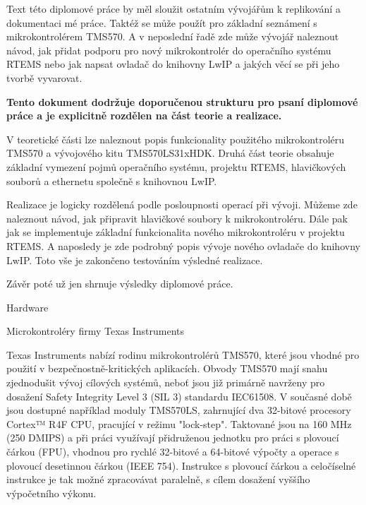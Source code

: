 
Text této diplomové práce by měl sloužit ostatním vývojářům k replikování a dokumentaci mé práce.
Taktéž se může použít pro základní seznámení s mikrokontrolérem TMS570.
A v neposlední řadě zde může vývojář naleznout návod, jak přidat podporu pro nový mikrokontrolér do operačního systému RTEMS nebo jak napsat ovladač do knihovny LwIP a jakých věcí se při jeho tvorbě vyvarovat.   

\medskip

{\bf
Tento dokument dodržuje doporučenou strukturu pro psaní diplomové práce a je explicitně rozdělen na část teorie a realizace.

V teoretické části lze naleznout popis funkcionality použitého mikrokontroléru TMS570 a vývojového kitu TMS570LS31xHDK.
Druhá část teorie obsahuje základní vymezení pojmů operačního systému, projektu RTEMS, hlavičkových souborů a ethernetu společně s knihovnou LwIP.

Realizace je logicky rozdělená podle posloupnosti operací při vývoji.
Můžeme zde naleznout návod, jak připravit hlavičkové soubory k mikrokontroléru.
Dále pak jak se implementuje základní funkcionalita nového mikrokontroléru v projektu RTEMS.
A naposledy je zde podrobný popis vývoje nového ovladače do knihovny LwIP.
Toto vše je zakončeno testováním výsledné realizace.

Závěr poté už jen shrnuje výsledky diplomové práce.}

\chap Hardware

\sec Microkontroléry firmy Texas Instruments

Texas Instruments nabízí rodinu mikrokontrolérů TMS570, které jsou vhodné pro použití v bezpečnostně-kritických aplikacích.
Obvody TMS570 mají snahu zjednodušit vývoj cílových systémů, neboť jsou již primárně navrženy pro dosažení Safety Integrity Level 3 (SIL 3) standardu IEC61508.
V současné době jsou dostupné například moduly TMS570LS, zahrnující dva 32-bitové procesory Cortex™ R4F CPU, pracující v režimu "lock-step".
Taktované jsou na 160 MHz (250 DMIPS) a při práci využívají přidruženou jednotku pro práci s plovoucí čárkou (FPU), vhodnou pro rychlé 32-bitové a 64-bitové výpočty a operace s plovoucí desetinnou čárkou (IEEE 754).
Instrukce s plovoucí čárkou a celočíselné instrukce je tak možné zpracovávat paralelně, s cílem dosažení vyššího výpočetního výkonu.


